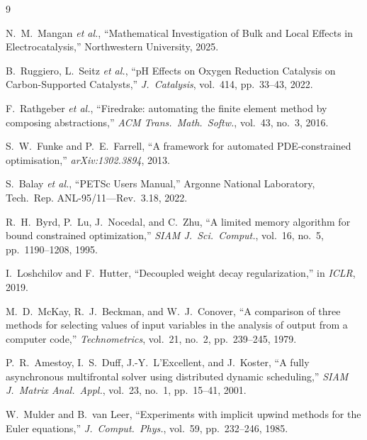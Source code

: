 \documentclass[11pt,a4paper]{article}
\begin{document}
\begin{thebibliography}{9}

N.~M.~Mangan \emph{et al.},
``Mathematical Investigation of Bulk and Local Effects in Electrocatalysis,''
Northwestern University, 2025.

B.~Ruggiero, L.~Seitz \emph{et al.},
``pH Effects on Oxygen Reduction Catalysis on Carbon-Supported Catalysts,''
\emph{J.\ Catalysis}, vol.~414, pp.~33--43, 2022.

F.~Rathgeber \emph{et al.},
``Firedrake: automating the finite element method by composing abstractions,''
\emph{ACM Trans.\ Math.\ Softw.}, vol.~43, no.~3, 2016.

S.~W.~Funke and P.~E.~Farrell,
``A framework for automated PDE-constrained optimisation,''
\emph{arXiv:1302.3894}, 2013.

S.~Balay \emph{et al.},
``PETSc Users Manual,'' Argonne National Laboratory, Tech.~Rep.
ANL-95/11---Rev.~3.18, 2022.

R.~H.~Byrd, P.~Lu, J.~Nocedal, and C.~Zhu,
``A limited memory algorithm for bound constrained optimization,''
\emph{SIAM J.\ Sci.\ Comput.}, vol.~16, no.~5, pp.~1190--1208, 1995.

I.~Loshchilov and F.~Hutter,
``Decoupled weight decay regularization,''
in \emph{ICLR}, 2019.

M.~D.~McKay, R.~J.~Beckman, and W.~J.~Conover,
``A comparison of three methods for selecting values of input variables
in the analysis of output from a computer code,''
\emph{Technometrics}, vol.~21, no.~2, pp.~239--245, 1979.

P.~R.~Amestoy, I.~S.~Duff, J.-Y.~L'Excellent, and J.~Koster,
``A fully asynchronous multifrontal solver using distributed dynamic scheduling,''
\emph{SIAM J.\ Matrix Anal.\ Appl.}, vol.~23, no.~1, pp.~15--41, 2001.

W.~Mulder and B.~van Leer,
``Experiments with implicit upwind methods for the Euler equations,''
\emph{J.\ Comput.\ Phys.}, vol.~59, pp.~232--246, 1985.

\end{thebibliography}
\end{document}
